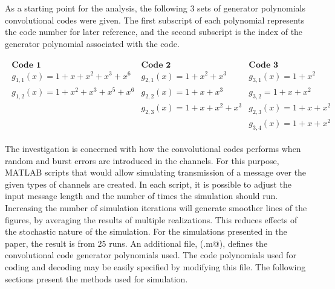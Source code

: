 As a starting point for the analysis, the following 3 sets of generator polynomials convolutional codes were given. The first subscript of each polynomial represents the code number for later reference, and the second subscript is the index of the generator polynomial associated with the code.

\begin{align*}
\begin{matrix}
\textbf{Code 1}&\textbf{Code 2}&\textbf{Code 3}\\
g_{1,1}(x) = 1 + x + x^2 + x^3 + x^6&g_{2,1}(x) = 1 + x^2 + x^3&g_{3,1}(x)=1 + x^2\\
g_{1,2}(x) = 1 + x^2 + x^3 + x^5 + x^6&g_{2,2}(x)=1 + x + x^3&g_{3,2} = 1+x+x^2\\
&g_{2,3}(x) = 1+x+x^2+x^3&g_{2,3}(x)=1+x+x^2\\
&&g_{3,4}(x) = 1+x+x^2
\end{matrix}
\end{align*}

The investigation is concerned with how the convolutional codes performs when random and burst errors are introduced in the channels. For this purpose, MATLAB scripts that would allow simulating transmission of a message over the given types of channels are created.
In each script, it is possible to adjust the input message length and the number of times the simulation should run. Increasing the number of simulation iterations will generate smoother lines of the figures, by averaging the results of multiple realizations. This reduces effects of the stochastic nature of the simulation. For the simulations presented in the paper, the result is from $25$ runs. 
An additional file, (\verb@trellisGenerator.m@), defines the convolutional code generator polynomials used. The code polynomials used for coding and decoding may be easily specified by modifying this file.
The following sections present the methods used for simulation.
